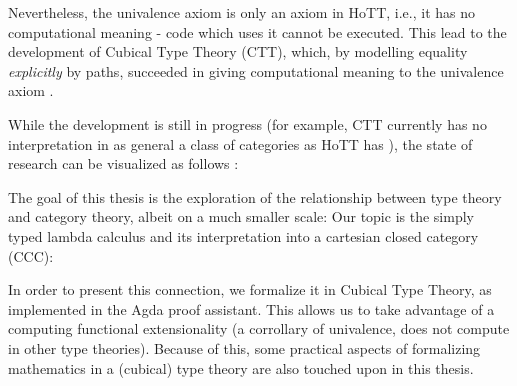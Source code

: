 \medskip

Nevertheless, the univalence axiom is only an axiom in HoTT, i.e., it has no
computational meaning - code which uses it cannot be executed. This lead
to the development of Cubical Type Theory (CTT), which, by modelling equality \textit{explicitly}
by paths, succeeded in giving computational meaning to the univalence axiom
\citep{CubicalTT}.

\medskip

While the development is still in progress (for example, CTT currently has no
interpretation in as general a class of categories as HoTT has \citep{ShulmanCTT}),
the state of research can be visualized as follows \citep{Trinity}:

\begin{center}
\end{center}

\medskip

The goal of this thesis is the exploration of the relationship between type
theory and category theory, albeit on a much smaller scale: Our topic is the
simply typed lambda calculus and its interpretation into a cartesian closed
category (CCC):

\begin{center}
\end{center}

In order to present this connection, we formalize it in Cubical Type Theory, as
implemented in the Agda proof assistant. This allows us to take advantage of a
computing functional extensionality (a corrollary of univalence, does not
compute in other type theories). Because of this, some practical aspects of formalizing
mathematics in a (cubical) type theory are also touched upon in this thesis.

